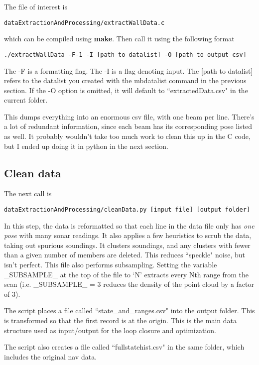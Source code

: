 \documentclass[12pt]{amsart}
\begin{document}
The file of interest is 
\begin{lstlisting}
dataExtractionAndProcessing/extractWallData.c
\end{lstlisting}
which can be compiled using \textbf{make}.
\vspace{12pt}
Then call it using the following format
\begin{small}
\begin{lstlisting}
./extractWallData -F-1 -I [path to datalist] -O [path to output csv]
\end{lstlisting}
\end{small}
The -F is a formatting flag. The -I is a flag denoting input. The [path to datalist] refers to the datalist you created with the mbdatalist command in the previous section. If the -O option is omitted, it will default to ``extractedData.csv" in the current folder.

This dumps everything into an enormous csv file, with one beam per line. There's a lot of redundant information, since each beam has its corresponding pose listed as well. It probably wouldn't take too much work to clean this up in the C code, but I ended up doing it in python in the next section.  

\subsection{Clean data}
The next call is 
\begin{lstlisting}
dataExtractionAndProcessing/cleanData.py [input file] [output folder]
\end{lstlisting}

In this step, the data is reformatted so that each line in the data file only has \emph{one pose} with many sonar readings. It also applies a few heuristics to scrub the data, taking out spurious soundings. It clusters soundings, and any clusters with fewer than a given number of members are deleted. This reduces ``speckle" noise, but isn't perfect. This file also performs subsampling. Setting the variable \_SUBSAMPLE\_ at the top of the file to `N' extracts every Nth range from the scan (i.e. \_SUBSAMPLE\_ = 3 reduces the density of the point cloud by a factor of 3).

The script places a file called ``state\_and\_ranges.csv" into the output folder. This is transformed so that the first record is at the origin. This is the main data structure used as input/output for the loop closure and optimization. 

The script also creates a file called ``fullstatehist.csv" in the same folder, which includes the original nav data.
\end{document}
